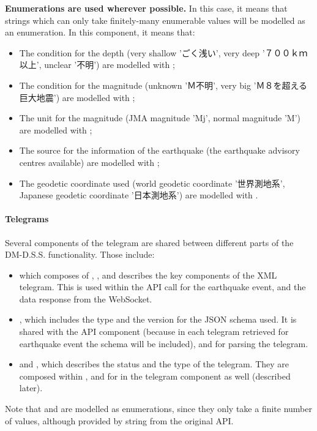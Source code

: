 \textbf{Enumerations are used wherever possible.} In this case, it means that strings which can only take finitely-many enumerable values will be modelled as an enumeration. In this component, it means that:
\begin{itemize}
    \item The condition for the depth (very shallow 'ごく浅い', very deep '７００ｋｍ以上',  unclear '不明') are modelled with ;
    \item The condition for the magnitude (unknown 'Ｍ不明', very big 'Ｍ８を超える巨大地震') are modelled with ;
    \item The unit for the magnitude (JMA magnitude 'Mj', normal magnitude 'M') are modelled with ;
    \item The source for the information of the earthquake (the earthquake advisory centres available) are modelled with ;
    \item The geodetic coordinate used (world geodetic coordinate '世界測地系', Japanese geodetic coordinate '日本測地系') are modelled with .
\end{itemize}

\paragraph{Telegrams}

Several components of the telegram are shared between different parts of the DM-D.S.S. functionality. Those include:
\begin{itemize}
    \item {} which composes of , , and describes the key components of the XML telegram. This is used within the API call for the earthquake event, and the data response from the WebSocket.
    \item {}, which includes the type and the version for the JSON schema used. It is shared with the API component (because in each telegram retrieved for earthquake event the schema will be included), and for parsing the telegram.
    \item {} and , which describes the status and the type of the telegram. They are composed within , and for  in the telegram component as well (described later).
\end{itemize}

Note that  and  are modelled as enumerations, since they only take a finite number of values, although provided by string from the original API.

